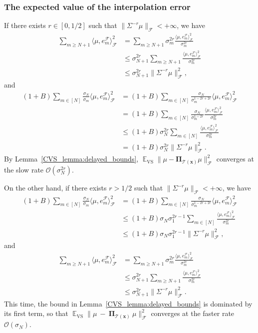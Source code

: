 \documentclass[twoside,11pt]{book}
\numberwithin{theorem}{chapter}
\numberwithin{definition}{chapter}
\numberwithin{proposition}{chapter}
\numberwithin{corollary}{chapter}
\numberwithin{example}{chapter}
\numberwithin{lemma}{chapter}
\numberwithin{assumption}{chapter}
\numberwithin{equation}{chapter}
\numberwithin{figure}{chapter}
\DeclareMathOperator{\VS}{\mathrm{VS}}
\DeclareMathOperator{\EX}{\mathbb{E}}
\DeclareMathOperator{\F}{\mathcal{F}}
\begin{document}
\subsubsection{The expected value of the interpolation error}
If there exists $r \in [0,1/2]$ such that $\displaystyle \| \Sigma^{-r} \mu \|_{\F} < +\infty$, we have
\begin{align}
\sum\limits_{m \geq N+1} \langle \mu,e_{m}^{\F} \rangle_{\F}^{2}
& = \sum\limits_{m \geq N+1} \sigma_{m}^{2r} \frac{ \langle \mu,e_{m}^{\F} \rangle_{\F}^{2}}{\sigma_{m}^{2r}} \\
& \leq \sigma_{N+1}^{2r} \sum\limits_{m \geq N+1} \frac{ \langle \mu,e_{m}^{\F} \rangle_{\F}^{2}}{\sigma_{m}^{2r}} \\
& \leq \sigma_{N+1}^{2r} \|\Sigma^{-r} \mu\|_{\F}^{2},
\end{align}
and
\begin{align}
(1+B) \sum\limits_{m \in [N]} \frac{\sigma_{N}}{\sigma_{m}} \langle \mu,e_{m}^{\F} \rangle_{\F}^{2}
& = (1+B) \sum\limits_{m \in [N]} \frac{\sigma_{N}}{\sigma_{m}^{1-2r+2r}} \langle \mu,e_{m}^{\F} \rangle_{\F}^{2} \\
& = (1+B) \sum\limits_{m \in [N]} \frac{\sigma_{N}}{\sigma_{m}^{1-2r}} \frac{\langle \mu,e_{m}^{\F} \rangle_{\F}^{2}}{\sigma_{m}^{2r}} \\
& \leq (1+B) \sigma_{N}^{2r} \sum\limits_{m \in [N]} \frac{\langle \mu,e_{m}^{\F} \rangle_{\F}^{2}}{\sigma_{m}^{2r}} \\
& = (1+B) \sigma_{N}^{2r} \|\Sigma^{-r} \mu\|_{\F}^{2}.
\end{align}
By Lemma~\ref{CVS_lemma:delayed_bounds}, $\displaystyle \EX_{\VS}\| \mu - \bm{\Pi}_{\mathcal{T}(\bm{x})} \mu \|_{\F}^{2}$ converges at the slow rate $\mathcal{O}(\sigma_{N}^{2r})$.

On the other hand, if there exists $r > 1/2$ such that $\displaystyle \| \Sigma^{-r} \mu \|_{\F} < +\infty$, we have
\begin{align}
(1+B) \sum\limits_{m \in [N]} \frac{\sigma_{N}}{\sigma_{m}} \langle \mu,e_{m}^{\F} \rangle_{\F}^{2}
& = (1+B) \sum\limits_{m \in [N]} \frac{\sigma_{N}}{\sigma_{m}^{1-2r+2r}} \langle \mu,e_{m}^{\F} \rangle_{\F}^{2} \\
& \leq (1+B) \sigma_{N} \sigma_{1}^{2r-1} \sum\limits_{m \in [N]} \frac{\langle \mu,e_{m}^{\F} \rangle_{\F}^{2}}{\sigma_{m}^{2r}} \\
&  \leq (1+B) \sigma_{N} \sigma_{1}^{2r-1} \|\Sigma^{-r} \mu\|_{\F}^{2},
\end{align}
and
\begin{align}
\sum\limits_{m \geq N+1} \langle \mu,e_{m}^{\F} \rangle_{\F}^{2}
& = \sum\limits_{m \geq N+1} \sigma_{m}^{2r} \frac{ \langle \mu,e_{m}^{\F} \rangle_{\F}^{2}}{\sigma_{m}^{2r}} \\
& \leq \sigma_{N+1}^{2r} \sum\limits_{m \geq N+1} \frac{ \langle \mu,e_{m}^{\F} \rangle_{\F}^{2}}{\sigma_{m}^{2r}} \\
& \leq \sigma_{N+1}^{2r} \|\Sigma^{-r} \mu\|_{\F}^{2}.
\end{align}
This time, the bound in Lemma~\ref{CVS_lemma:delayed_bounds} is dominated by its first term, so that $\displaystyle \EX_{\VS}\|\mu~-~\bm{\Pi}_{\mathcal{T}(\bm{x})}~\mu \|_{\F}^{2}$ converges at the faster rate $\mathcal{O}(\sigma_{N})$.
\end{document}
